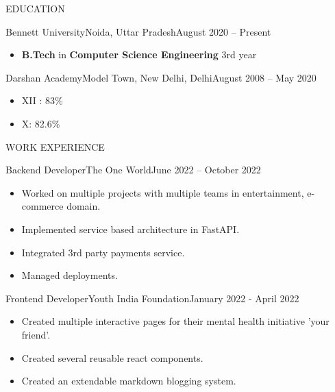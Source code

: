 \documentclass[]{mcdowellcv}
\begin{document}
	\makeheader
	

\begin{cvsection}{EDUCATION}
		\begin{cvsubsection}{Bennett University}{Noida, Uttar Pradesh}{August 2020 -- Present}
			\begin{itemize}
				\item {\bf B.Tech} in {\bf Computer Science Engineering} 3rd year
			\end{itemize}
		\end{cvsubsection}
            \begin{cvsubsection}{Darshan Academy}{Model Town, New Delhi, Delhi}{August 2008 -- May 2020}
			\begin{itemize}
				\item XII : 83\%
                    \item X: 82.6\%
			\end{itemize}
		\end{cvsubsection}
	\end{cvsection}

	\begin{cvsection}{WORK EXPERIENCE}
		\begin{cvsubsection}{Backend Developer}{The One World}{June 2022 – October 2022}
			\begin{itemize}
            \item Worked on multiple projects with multiple teams in entertainment, e-commerce domain.
            \item Implemented service based architecture in FastAPI.
            \item Integrated 3rd party payments service.
            \item Managed deployments.
			\end{itemize}
		\end{cvsubsection}
		
		\begin{cvsubsection}{Frontend Developer}{Youth India Foundation}{January 2022 - April 2022}	
			\begin{itemize}
            	\item Created multiple interactive pages for their mental health initiative 'your friend'.
            	\item Created several reusable react components. 
            	\item Created an extendable markdown blogging system.
			\end{itemize}
		\end{cvsubsection}

	\end{cvsection}
\end{document}
